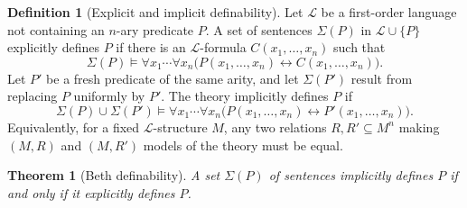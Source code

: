 \documentclass[UTF8,11pt]{ctexart}
\newtheorem*{theorem}{Theorem}
\theoremstyle{definition}
\newtheorem*{definition}{Definition}
\begin{document}
\begin{definition}[Explicit and implicit definability]
Let $\mathcal L$ be a first-order language not containing an $n$-ary predicate
$P$. A set of sentences $\Sigma(P)$ in $\mathcal L\cup\{P\}$ explicitly
defines $P$ if there is an $\mathcal L$-formula $C(x_1,\ldots,x_n)$ such that
\[
 \Sigma(P)\models\forall x_1\cdots\forall x_n
       \bigl(P(x_1,\ldots,x_n)\leftrightarrow C(x_1,\ldots,x_n)\bigr).
\]
Let $P'$ be a fresh predicate of the same arity, and let $\Sigma(P')$ result
from replacing $P$ uniformly by $P'$. The theory implicitly defines $P$ if
\[
 \Sigma(P)\cup\Sigma(P')\models\forall x_1\cdots\forall x_n
       \bigl(P(x_1,\ldots,x_n)\leftrightarrow P'(x_1,\ldots,x_n)\bigr).
\]
Equivalently, for a fixed $\mathcal L$-structure $M$, any two relations
$R,R'\subseteq M^n$ making $(M,R)$ and $(M,R')$ models of the theory must be equal.
\end{definition}
\begin{theorem}[Beth definability]
A set $\Sigma(P)$ of sentences implicitly defines $P$ if and only if it
explicitly defines $P$.
\end{theorem}
\end{document}

